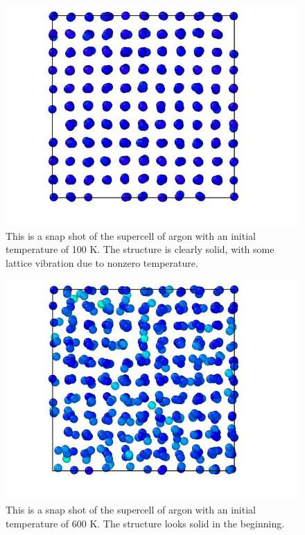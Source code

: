 \begin{multicols}{2}

\begin{figure}[H]
\includegraphics[width=\linewidth]{../figures/solid_100}\caption{This is a snap shot of the supercell of argon with an initial temperature of 100 K. The structure is clearly solid, with some lattice vibration due to nonzero temperature.}\label{fig:solid_100K}
\end{figure}

\begin{figure}[H]
\includegraphics[width=\linewidth]{../figures/solid_600}\caption{This is a snap shot of the supercell of argon with an initial temperature of 600 K. The structure looks solid in the beginning.}\label{fig:solid_600K}
\end{figure}


\end{multicols}
